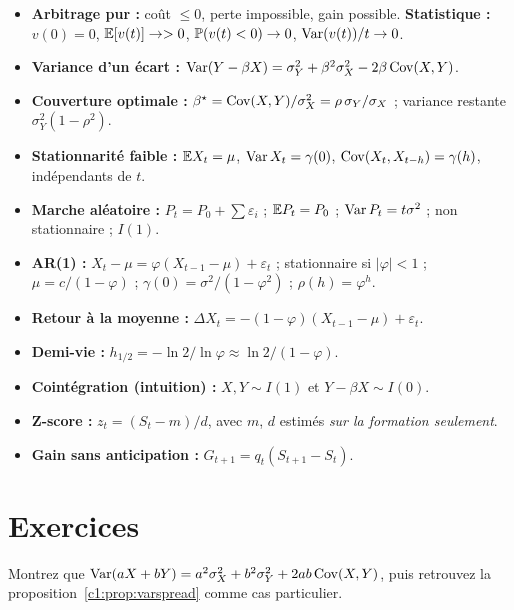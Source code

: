 \begin{whiteboard}
\begin{itemize}[leftmargin=1.2em]
\item \textbf{Arbitrage pur :} coût $\le 0$, perte impossible, gain possible. \textbf{Statistique :} $v(0)=0$, $\mathbb{E}[v(t)]\to>0$, $\mathbb{P}(v(t)<0)\to0$, $\operatorname{Var}(v(t))/t\to0$.
\item \textbf{Variance d'un écart :} $\operatorname{Var}(Y-\beta X) = \sigma_Y^2 + \beta^2\sigma_X^2 - 2\beta\operatorname{Cov}(X,Y)$.
\item \textbf{Couverture optimale :} $\beta^\star = \operatorname{Cov}(X,Y)/\sigma_X^2 = \rho\,\sigma_Y/\sigma_X$ ; variance restante $\sigma_Y^2(1-\rho^2)$.
\item \textbf{Stationnarité faible :} $\mathbb{E} X_t = \mu$, $\operatorname{Var} X_t = \gamma(0)$, $\operatorname{Cov}(X_t,X_{t-h}) = \gamma(h)$, indépendants de $t$.
\item \textbf{Marche aléatoire :} $P_t = P_0 + \sum\varepsilon_i$ ; $\mathbb{E} P_t = P_0$ ; $\operatorname{Var} P_t = t\sigma^2$ ; non stationnaire ; $I(1)$.
\item \textbf{AR(1) :} $X_t - \mu = \varphi(X_{t-1}-\mu) + \varepsilon_t$ ; stationnaire si $|\varphi|<1$ ; $\mu = c/(1-\varphi)$ ; $\gamma(0) = \sigma^2/(1-\varphi^2)$ ; $\rho(h) = \varphi^h$.
\item \textbf{Retour à la moyenne :} $\Delta X_t = -(1-\varphi)(X_{t-1}-\mu) + \varepsilon_t$.
\item \textbf{Demi-vie :} $h_{1/2} = -\ln2/\ln\varphi \approx \ln 2/(1-\varphi)$.
\item \textbf{Cointégration (intuition) :} $X, Y \sim I(1)$ et $Y - \beta X \sim I(0)$.
\item \textbf{Z-score :} $z_t = (S_t - m)/d$, avec $m$, $d$ estimés \emph{sur la formation seulement}.
\item \textbf{Gain sans anticipation :} $G_{t+1} = q_t(S_{t+1}-S_t)$.
\end{itemize}
\end{whiteboard}

\section{Exercices}

\begin{exercise}
Montrez que $\operatorname{Var}(aX + bY) = a^2\sigma_X^2 + b^2\sigma_Y^2 + 2ab\operatorname{Cov}(X,Y)$, puis retrouvez la proposition~\ref{c1:prop:varspread} comme cas particulier.
\end{exercise}

